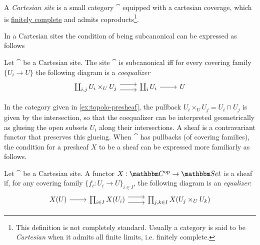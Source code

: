 \documentclass[a4paper,11pt]{article}  %
\begin{document}
\begin{definition}
	A \emph{Cartesian site} is a small category \( \cat \) equipped with a cartesian coverage, which is \href{https://ncatlab.org/nlab/show/finitely+complete+category\#definition}{finitely complete} and admits coproducts\footnote{This definition is not completely standard. Usually a category is said to be \emph{Cartesian} when it admits all finite limits, i.e. finitely complete.}.
\end{definition}


In a Cartesian sites the condition of being subcanonical can be expressed as follows
\begin{lemma}\label{lem:subcanon-bloh}
	Let $\cat$ be a Cartesian site.
	The site $\cat$ is subcanonical iff for every covering family $\{U_i\to U\}$ the following diagram is a \emph{coequalizer}
		\begin{equation}
			\begin{tikzcd}
				\coprod_{i,j} U_i \times_U U_j \ar[r, yshift=4px]\ar[r, yshift=-4px] & \coprod_i U_i \ar[r] & U
			\end{tikzcd}		
		\end{equation}
\end{lemma}
%
In the category given in \cref{ex:topolo-presheaf}, the pullback $U_i\times_U U_j = U_i \cap U_j$ is given by the intersection, so that the
coequalizer can be interpreted geometrically as glueing the open subsets $U_i$ along their intersections. 
A sheaf is a contravariant functor that preserves this glueing.
When $\cat$ has pullbacks (of covering families), the condition for a presheaf \(X\) to be a sheaf can be expressed more familiarly as follows.

\begin{lemma}
	Let $\cat$ be a Cartesian site.
	A functor $X: \cat^\op \to \Set$ is a sheaf if, for any covering family \(\{f_i : U_i \to U\}_{i \in I}\), the following diagram is an \emph{equalizer}:
	\begin{equation}
		\begin{tikzcd}
			X(U) \ar[r] & \prod_{i \in I} X(U_i) \ar[r, yshift=4px]\ar[r, yshift=-4px] & \prod_{j,k \in I} X(U_j \times_U U_k) 
		\end{tikzcd}	
	\end{equation}
\end{lemma}


\clearpage
\end{document}
